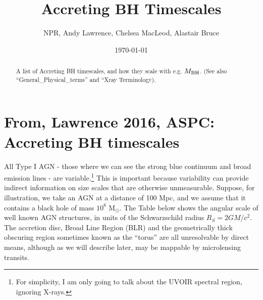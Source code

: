 \documentclass[11pt]{article}
\begin{document}
\title{Accreting BH Timescales}
\author{NPR, Andy Lawrence, Chelsea MacLeod, Alastair Bruce}
\date{\today}
\maketitle


\begin{abstract}
A list of Accreting BH timescales, and how they scale 
with e.g. $M_{\rm BH}$. 
(See also ``General\_Physical\_terms'' and ``Xray Terminology).
\end{abstract}


\section{From, Lawrence 2016, ASPC: Accreting BH timescales}
All Type I AGN - those where we can see the strong blue continuum and broad emission lines - are variable.\footnote{For simplicity, I am only going to talk about the UVOIR spectral region, ignoring X-rays.} This is important because variability can provide indirect information on size scales that are otherwise unmeasurable. Suppose, for illustration, we take an AGN at a distance of 100 Mpc, and we assume that it contains a black hole of mass $10^8$ M$_\odot$. The Table below shows the angular scale of well known AGN structures, in units of the Schwarzschild radius $R_S=2GM/c^2$. The accretion disc, Broad Line Region (BLR) and the geometrically thick obscuring region sometimes known as the ``torus'' are all unresolvable by direct means, although as we will describe later, may be mappable by microlensing transits. 
\end{document}
